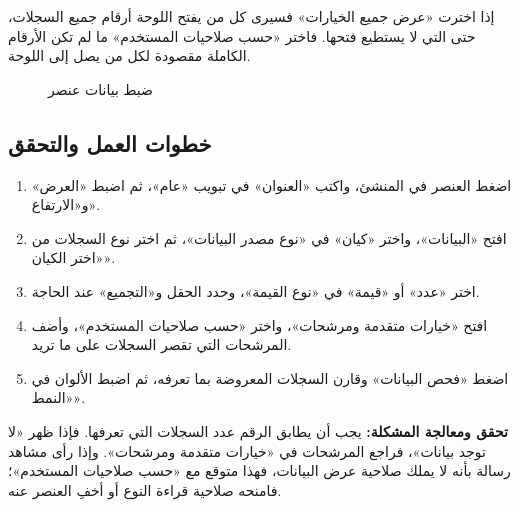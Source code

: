 \begin{rcwarn}
إذا اخترت «عرض جميع الخيارات» فسيرى كل من يفتح اللوحة أرقام جميع السجلات، حتى التي لا يستطيع فتحها. فاختر «حسب صلاحيات المستخدم» ما لم تكن الأرقام الكاملة مقصودة لكل من يصل إلى اللوحة.
\end{rcwarn}

\begin{figure}[H]
\centering
{}
\rclegend
\caption{ضبط بيانات عنصر}
\label{fig:builder-dashboards-widget-settings-flow}
\end{figure}

\subsection{خطوات العمل والتحقق}
\begin{enumerate}
\item اضغط العنصر في المنشئ، واكتب «العنوان» في تبويب «عام»، ثم اضبط «العرض» و«الارتفاع».
\item افتح «البيانات»، واختر «كيان» في «نوع مصدر البيانات»، ثم اختر نوع السجلات من «اختر الكيان».
\item اختر «عدد» أو «قيمة» في «نوع القيمة»، وحدد الحقل و«التجميع» عند الحاجة.
\item افتح «خيارات متقدمة ومرشحات»، واختر «حسب صلاحيات المستخدم»، وأضف المرشحات التي تقصر السجلات على ما تريد.
\item اضغط «فحص البيانات» وقارن السجلات المعروضة بما تعرفه، ثم اضبط الألوان في «النمط».
\end{enumerate}

\textbf{تحقق ومعالجة المشكلة:} يجب أن يطابق الرقم عدد السجلات التي تعرفها. فإذا ظهر «لا توجد بيانات»، فراجع المرشحات في «خيارات متقدمة ومرشحات». وإذا رأى مشاهد رسالة بأنه لا يملك صلاحية عرض البيانات، فهذا متوقع مع «حسب صلاحيات المستخدم»؛ فامنحه صلاحية قراءة النوع أو أخفِ العنصر عنه.

